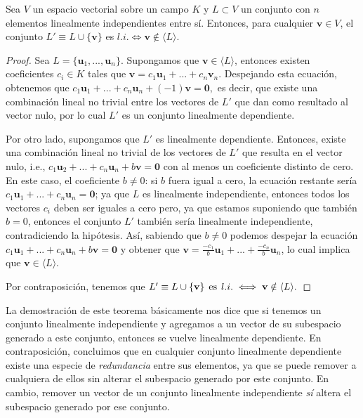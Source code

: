 \documentclass[12pt,dvipsnames]{article}
\newenvironment{teorema}[2][Teorema]{\begin{trivlist}
\item[\hskip \labelsep {\bfseries #1}\hskip \labelsep {\bfseries #2.}]}{\end{trivlist}}
\begin{document}
\begin{teorema} {3.3.3.3}

Sea $V$ un espacio vectorial sobre un campo $K$ y $L\subset V$ un conjunto con $n$ elementos linealmente independientes entre sí. Entonces, para cualquier $\mathbf{v}\in V$, el conjunto $L'\equiv L\cup \{\mathbf{v}\}$ es $l.i. \iff \mathbf{v}\notin \langle L \rangle$.

\begin{proof}
Sea $L=\{\mathbf{u}_1, ... , \mathbf{u}_n\}.$ Supongamos que $\mathbf{v}\in\langle L \rangle$, entonces existen coeficientes $c_i\in K$ tales que $\mathbf{v}=c_1\mathbf{u}_1+...+c_n\mathbf{v}_n.$ Despejando esta ecuación, obtenemos que $c_1\mathbf{u}_1+...+c_n\mathbf{u}_n+(-1)\mathbf{v}=\mathbf{0},$ es decir, que existe una combinación lineal no trivial entre los vectores de $L'$ que dan como resultado al vector nulo, por lo cual $L'$ es un conjunto linealmente dependiente.

Por otro lado, supongamos que $L'$ es linealmente dependiente. Entonces, existe una combinación lineal no trivial de los vectores de $L'$ que resulta en el vector nulo, i.e., $c_1\mathbf{u}_2+...+c_n\mathbf{u}_n+b\mathbf{v}=\mathbf{0}$ con al menos un coeficiente distinto de cero. En este caso, el coeficiente $b\neq 0$: si $b$ fuera igual a cero, la ecuación restante sería $c_1\mathbf{u}_1+...+c_n\mathbf{u}_n=\mathbf{0}$; ya que $L$ es linealmente independiente, entonces todos los vectores $c_i$ deben ser iguales a cero pero, ya que estamos suponiendo que también $b=0$, entonces el conjunto $L'$ también sería linealmente independiente, contradiciendo la hipótesis. Así, sabiendo que $b\neq 0$ podemos despejar la ecuación $c_1\mathbf{u}_1+...+c_n\mathbf{u}_n+b\mathbf{v}=\mathbf{0}$ y obtener que $\mathbf{v}=\frac{-c_1}{b}\mathbf{u}_1+...+\frac{-c_n}{b}\mathbf{u}_n$, lo cual implica que $\mathbf{v}\in\langle L \rangle.$

    Por contraposición, tenemos que $L'\equiv L\cup\{\mathbf{v}\}\hspace{1.5mm}\text{es}\hspace{1.5mm} l.i.\iff \mathbf{v}\notin \langle L \rangle.$

\end{proof}

    La demostración de este teorema básicamente nos dice que si tenemos un conjunto linealmente independiente y agregamos a un vector de su subespacio generado a este conjunto, entonces se vuelve linealmente dependiente. En contraposición, concluimos que en cualquier conjunto linealmente dependiente existe una especie de \emph{redundancia} entre sus elementos, ya que se puede remover a cualquiera de ellos sin alterar el subespacio generado por este conjunto. En cambio, remover un vector de un conjunto linealmente independiente \emph{sí} altera el subespacio generado por ese conjunto.
\end{teorema}
\end{document}
